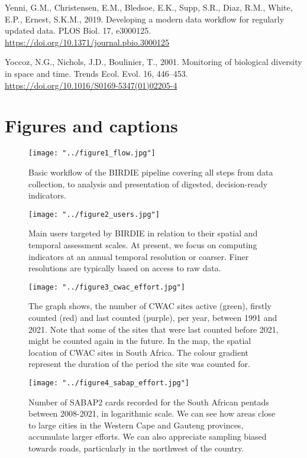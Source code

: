 \documentclass[utf8]{frontiersSCNS}
\begin{document}
Yenni, G.M., Christensen, E.M., Bledsoe, E.K., Supp, S.R., Diaz, R.M.,
White, E.P., Ernest, S.K.M., 2019. Developing a modern data workflow for
regularly updated data. PLOS Biol. 17, e3000125.
\url{https://doi.org/10.1371/journal.pbio.3000125}

Yoccoz, N.G., Nichols, J.D., Boulinier, T., 2001. Monitoring of
biological diversity in space and time. Trends Ecol. Evol. 16, 446--453.
\url{https://doi.org/10.1016/S0169-5347(01)02205-4}

\hypertarget{figures-and-captions}{%
\section*{Figures and captions}\label{figures-and-captions}}

\begin{figure}[!h]
\centering
  \texttt{[image: "../figure1\_flow.jpg"]}
  \caption{Basic workflow of the BIRDIE pipeline covering all steps from data collection, to analysis and presentation of digested, decision-ready indicators.}
\end{figure}

\begin{figure}[!h]
\centering
  \texttt{[image: "../figure2\_users.jpg"]}
  \caption{Main users targeted by BIRDIE in relation to their spatial and temporal assessment scales. At present, we focus on computing indicators at an annual temporal resolution or coarser. Finer resolutions are typically based on access to raw data.}
\end{figure}

\begin{figure}[!h]
\centering
  \texttt{[image: "../figure3\_cwac\_effort.jpg"]}
  \caption{The graph shows, the number of CWAC sites active (green), firstly counted (red) and last counted (purple), per year, between 1991 and 2021. Note that some of the sites that were last counted before 2021, might be counted again in the future. In the map, the spatial location of CWAC sites in South Africa. The colour gradient represent the duration of the period the site was counted for.}
\end{figure}

\begin{figure}[!h]
\centering
  \texttt{[image: "../figure4\_sabap\_effort.jpg"]}
  \caption{Number of SABAP2 cards recorded for the South African pentads between 2008-2021, in logarithmic scale. We can see how areas close to large cities in the Western Cape and Gauteng provinces, accumulate larger efforts. We can also appreciate sampling biased towards roads, particularly in the northwest of the country.}
\end{figure}
\end{document}
